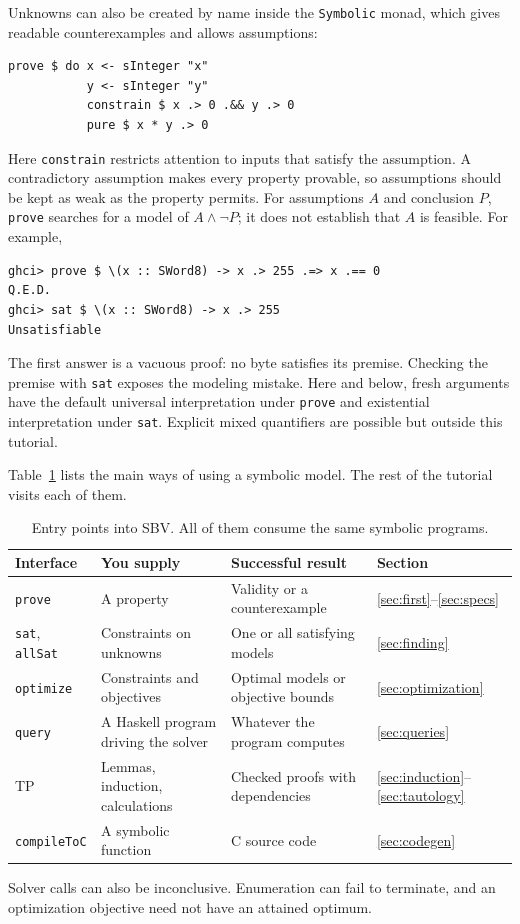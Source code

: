 \documentclass[review]{jfp-epi}
\newcommand{\code}[1]{\texttt{#1}}
\begin{document}
Unknowns can also be created by name inside the \code{Symbolic} monad, which
gives readable counterexamples and allows assumptions:
\begin{lstlisting}
prove $ do x <- sInteger "x"
           y <- sInteger "y"
           constrain $ x .> 0 .&& y .> 0
           pure $ x * y .> 0
\end{lstlisting}
Here \code{constrain} restricts attention to inputs that satisfy the assumption.
A contradictory assumption makes every property provable, so assumptions should
be kept as weak as the property permits. For assumptions $A$ and conclusion $P$,
\code{prove} searches for a model of $A \land \neg P$; it does not establish that
$A$ is feasible. For example,
\begin{lstlisting}
ghci> prove $ \(x :: SWord8) -> x .> 255 .=> x .== 0
Q.E.D.
ghci> sat $ \(x :: SWord8) -> x .> 255
Unsatisfiable
\end{lstlisting}
The first answer is a vacuous proof: no byte satisfies its premise. Checking the
premise with \code{sat} exposes the modeling mistake. Here and below, fresh
arguments have the default universal interpretation under \code{prove} and
existential interpretation under \code{sat}. Explicit mixed quantifiers are
possible but outside this tutorial.

Table~\ref{tab:interfaces} lists the main ways of using a symbolic model. The
rest of the tutorial visits each of them.

\begin{table}[t]
\caption{Entry points into SBV. All of them consume the same symbolic programs.}
\label{tab:interfaces}
\begin{tabularx}{\linewidth}{@{}l X X l@{}}
\toprule
Interface & You supply & Successful result & Section\\
\midrule
\code{prove} & A property & Validity or a counterexample & \ref{sec:first}--\ref{sec:specs}\\
\code{sat}, \code{allSat} & Constraints on unknowns & One or all satisfying models & \ref{sec:finding}\\
\code{optimize} & Constraints and objectives & Optimal models or objective bounds & \ref{sec:optimization}\\
\code{query} & A Haskell program driving the solver & Whatever the program computes & \ref{sec:queries}\\
TP & Lemmas, induction, calculations & Checked proofs with dependencies & \ref{sec:induction}--\ref{sec:tautology}\\
\code{compileToC} & A symbolic function & C source code & \ref{sec:codegen}\\
\bottomrule
\end{tabularx}
\smallskip
\par\small Solver calls can also be inconclusive. Enumeration can fail to
terminate, and an optimization objective need not have an attained optimum.
\end{table}
\end{document}
